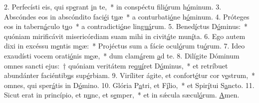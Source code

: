 2. Perfecísti eis, qui sp\uline{e}rant \uline{i}n te,~* in conspéctu fili\uline{ó}rum h\uline{ó}minum.
3. Abscóndes eos in abscóndito faci\uline{é}i t\uline{u}æ~* a conturbati\uline{ó}ne h\uline{ó}minum.
4. Próteges eos in tabern\uline{á}culo t\uline{u}o~* a contradicti\uline{ó}ne lin\uline{guá}rum.
5. Bened\uline{í}ctus D\uline{ó}minus:~* quóniam mirificávit misericórdiam suam mihi in civit\uline{á}te mun\uline{í}ta.
6. Ego autem dixi in excéssu m\uline{e}ntis m\uline{e}æ:~* Projéctus sum a fácie ocul\uline{ó}rum tu\uline{ó}rum.
7. Ideo exaudísti vocem orati\uline{ó}nis m\uline{e}æ,~* dum clam\uline{á}rem \uline{a}d te.
8. Dilígite Dóminum omnes sancti ejus:~† quóniam veritátem re\uline{quí}ret D\uline{ó}minus,~* et retríbuet abundánter faciéntib\uline{u}s sup\uline{é}rbiam.
9. Viríliter ágite, et confort\uline{é}tur cor v\uline{e}strum,~* omnes, qui sper\uline{á}tis in D\uline{ó}mino.
10. Glória P\uline{a}tri, et F\uline{í}lio,~* et Spir\uline{í}tui S\uline{a}ncto.
11. Sicut erat in princípio, et n\uline{u}nc, et s\uline{e}mper,~* et in sǽcula sæcul\uline{ó}rum. \uline{A}men.
